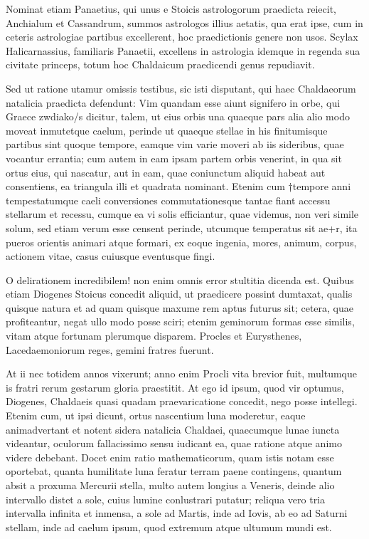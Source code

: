  Nominat etiam Panaetius, qui unus e Stoicis astrologorum praedicta reiecit, Anchialum et Cassandrum, summos astrologos illius aetatis, qua erat ipse, cum in ceteris astrologiae partibus excellerent, hoc praedictionis genere non usos. Scylax Halicarnassius, familiaris Panaetii, excellens in astrologia idemque in regenda sua civitate princeps, totum hoc Chaldaicum praedicendi genus repudiavit.

 Sed ut ratione utamur omissis testibus, sic isti disputant, qui haec Chaldaeorum natalicia praedicta defendunt: Vim quandam esse aiunt signifero in orbe, qui Graece zwdiako/s dicitur, talem, ut eius orbis una quaeque pars alia alio modo moveat inmutetque caelum, perinde ut quaeque stellae in his finitumisque partibus sint quoque tempore, eamque vim varie moveri ab iis sideribus, quae vocantur errantia; cum autem in eam ipsam partem orbis venerint, in qua sit ortus eius, qui nascatur, aut in eam, quae coniunctum aliquid habeat aut consentiens, ea triangula illi et quadrata nominant. Etenim cum †tempore anni tempestatumque caeli conversiones commutationesque tantae fiant accessu stellarum et recessu, cumque ea vi solis efficiantur, quae videmus, non veri simile solum, sed etiam verum esse censent perinde, utcumque temperatus sit ae+r, ita pueros orientis animari atque formari, ex eoque ingenia, mores, animum, corpus, actionem vitae, casus cuiusque eventusque fingi.

 O delirationem incredibilem! non enim omnis error stultitia dicenda est. Quibus etiam Diogenes Stoicus concedit aliquid, ut praedicere possint dumtaxat, qualis quisque natura et ad quam quisque maxume rem aptus futurus sit; cetera, quae profiteantur, negat ullo modo posse sciri; etenim geminorum formas esse similis, vitam atque fortunam plerumque disparem. Procles et Eurysthenes, Lacedaemoniorum reges, gemini fratres fuerunt.

 At ii nec totidem annos vixerunt; anno enim Procli vita brevior fuit, multumque is fratri rerum gestarum gloria praestitit. At ego id ipsum, quod vir optumus, Diogenes, Chaldaeis quasi quadam praevaricatione concedit, nego posse intellegi. Etenim cum, ut ipsi dicunt, ortus nascentium luna moderetur, eaque animadvertant et notent sidera natalicia Chaldaei, quaecumque lunae iuncta videantur, oculorum fallacissimo sensu iudicant ea, quae ratione atque animo videre debebant. Docet enim ratio mathematicorum, quam istis notam esse oportebat, quanta humilitate luna feratur terram paene contingens, quantum absit a proxuma Mercurii stella, multo autem longius a Veneris, deinde alio intervallo distet a sole, cuius lumine conlustrari putatur; reliqua vero tria intervalla infinita et inmensa, a sole ad Martis, inde ad Iovis, ab eo ad Saturni stellam, inde ad caelum ipsum, quod extremum atque ultumum mundi est.

